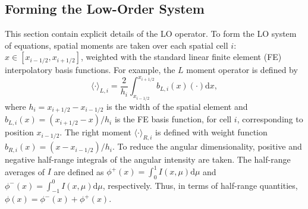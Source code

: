 \documentclass[11pt]{article}
\renewcommand{\d}{\mathrm{d}}
\newcommand{\mom}[1]{\langle #1 \rangle}
\newcommand{\xr}{{x_{i+1/2}}}
\newcommand{\il}{{i-1/2}}
\newcommand{\ir}{{i+1/2}}
\begin{document}
\subsection{Forming the Low-Order System}

This section contain explicit details of the LO operator.
To form the LO system of equations, spatial moments are taken over each spatial cell $i$:
$x\in[x_{i-1/2},x_{i+1/2}]$, weighted with the standard linear finite element (FE)
interpolatory basis functions.  For example, the $L$  moment operator is defined by
\begin{equation}\label{x_mom}
\mom{\cdot}_{L,i} = \frac{2}{h_i} \int_{x_{i-1/2}}^{\xr} b_{L,i}(x) (\cdot) \d x,
\end{equation}
where $h_i=x_{i+1/2}-x_{i-1/2}$ is the width of the spatial element and
$b_{L,i}(x)=(x_{i+1/2}-x)/h_i$ is the FE basis function, for cell $i$, corresponding to position
$x_{i-1/2}$.  The right moment $\mom{\cdot}_{R,i}$ is defined with weight function $b_{R,i}(x)=(x -
x_{i-1/2})/h_i$. 
To reduce the angular dimensionality, positive and
negative half-range integrals of the angular intensity are taken.  The half-range
averages of $I$ are defined as $ \phi^+(x) = \int_0^{1} I(x,\mu) \d \mu$ and $ \phi^-(x) = \int_{-1}^{0} I(x,\mu) \d
\mu$, respectively.  Thus, in terms of half-range quantities, $\phi(x) = \phi^-(x) +
\phi ^+(x)$.  
\end{document}
